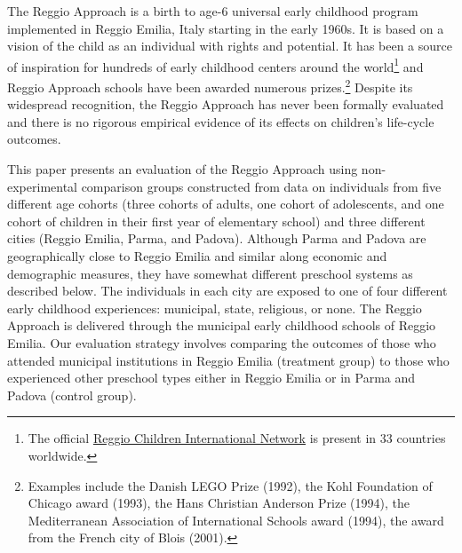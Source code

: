 The Reggio Approach is a birth to age-6 universal early childhood program implemented in Reggio Emilia, Italy starting in the early 1960s. It is based on a vision of the child as an individual with rights and potential. It has been a source of inspiration for hundreds of early childhood centers around the world\footnote{The official \href{http://www.reggiochildren.it/network/?lang=en}{Reggio Children International Network} is present in 33 countries worldwide.} and Reggio Approach schools have been awarded numerous prizes.\footnote{Examples include the Danish LEGO Prize (1992), the Kohl Foundation of Chicago award (1993), the Hans Christian Anderson Prize (1994), the Mediterranean Association of International Schools award (1994), the award from the French city of Blois (2001).} Despite its widespread recognition, the Reggio Approach has never been formally evaluated and there is no rigorous empirical evidence of its effects on children's life-cycle outcomes.

This paper presents an evaluation of the Reggio Approach using non-experimental comparison groups constructed from data on individuals from five different age cohorts (three cohorts of adults, one cohort of adolescents, and one cohort of children in their first year of elementary school) and three different cities (Reggio Emilia, Parma, and Padova). Although Parma and Padova are geographically close to Reggio Emilia and similar along economic and demographic measures, they have somewhat different preschool systems as described below. The individuals in each city are exposed to one of four different early childhood experiences: municipal, state, religious, or none. The Reggio Approach is delivered through the municipal early childhood schools of Reggio Emilia. Our evaluation strategy involves comparing the outcomes of those who attended municipal institutions in Reggio Emilia (treatment group) to those who experienced other preschool types either in Reggio Emilia or in Parma and Padova (control group).

